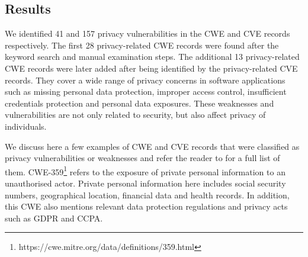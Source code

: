 
\subsection{Results}

We identified 41 and 157 privacy vulnerabilities in the CWE and CVE records respectively. The first 28 privacy-related CWE records were found after the keyword search and manual examination steps. The additional 13 privacy-related CWE records were later added after being identified by the privacy-related CVE records. They cover a wide range of privacy concerns in software applications such as missing personal data protection, improper access control, insufficient credentials protection and personal data exposures. These weaknesses and vulnerabilities are not only related to security, but also affect privacy of individuals.


We discuss here a few examples of CWE and CVE records that were classified as privacy vulnerabilities or weaknesses and refer the reader to \cite{rep-pkg-privul} for a full list of them. CWE-359\footnote{https://cwe.mitre.org/data/definitions/359.html} refers to the exposure of private personal information to an unauthorised actor. Private personal information here includes social security numbers, geographical location, financial data and health records. In addition, this CWE also mentions relevant data protection regulations and privacy acts such as GDPR and CCPA.

